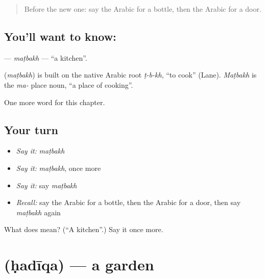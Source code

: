 \label{lesson:AR-C72-matbakh}



\begin{quote}
Before the new one: say the Arabic for a bottle, then the Arabic for a door.
\end{quote}

\subsection*{You'll want to know: }
\textbf{} — \emph{maṭbakh} — \textquotedblleft{}a kitchen\textquotedblright{}.

\begin{cousinweb}
\textbf{} (\emph{maṭbakh}) is built on the native Arabic root \emph{ṭ-b-kh}, \textquotedblleft{}to cook\textquotedblright{} (Lane). \emph{Maṭbakh} is the \emph{ma-} place noun, \textquotedblleft{}a place of cooking\textquotedblright{}.
\end{cousinweb}

\begin{grammarlens}[title={What you've built}]
One more word for this chapter.
\end{grammarlens}

\subsection*{Your turn}
\begin{itemize}
\raggedright
  \item \emph{Say it:} \emph{maṭbakh}
  \item \emph{Say it:} \emph{maṭbakh}, once more
  \item \emph{Say it:} say \emph{maṭbakh}
  \item \emph{Recall:} say the Arabic for a bottle, then the Arabic for a door, then say \emph{maṭbakh} again
\end{itemize}

\begin{tcolorbox}[breakable,colback=teal!4,colframe=teal!35!black,title={Before you move on}]
What does  mean? (\textquotedblleft{}A kitchen\textquotedblright{}.) Say it once more.
\end{tcolorbox}
\section[\texorpdfstring{\ar{حديقة} (ḥadīqa)}{حديقة (ḥadīqa)}]{ (ḥadīqa) — a garden}

